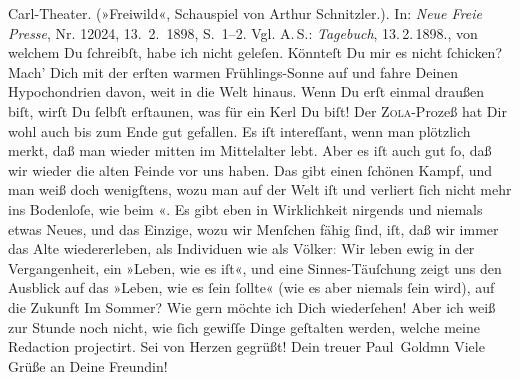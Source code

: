 \begin{ledgroupsized}[t]{13cm}
{{{{                        Carl-Theater. (»Freiwild«, Schauspiel von Arthur Schnitzler.)}. In: \emph{Neue Freie Presse}, Nr. 12024, 13. 2. 1898, S. 1–2. Vgl. A. S.: \emph{Tagebuch}, 13. 2. 1898.}}}\label{K_L02839-5h}, von
               welchem Du ſchreibſt, habe ich nicht geleſen. Könnteſt Du mir es nicht ſchicken?\pend
           \pstart
           Mach’ Dich mit der erſten warmen Frühlings-Sonne auf und fahre Deinen Hypochondrien
               davon, weit in die Welt hinaus. Wenn Du erſt einmal draußen biſt, wirſt Du ſelbſt
               erſtaunen, was für ein Kerl Du biſt!\pend
           \pstart
           Der \textsc{Zola}-Prozeß hat Dir wohl auch bis zum Ende gut gefallen. Es iſt intereſſant,  wenn man plötzlich merkt, daß man wieder mitten im
               Mittelalter lebt. Aber es iſt auch gut ſo, daß \strikeout{\textcolor{gray}{w}} wir wieder die alten Feinde vor uns haben.  Das gibt einen ſchönen Kampf, und {\pb}man weiß
               doch wenigſtens, \strikeout{\textcolor{gray}{e}} wozu man auf der Welt iſt und verliert ſich nicht mehr ins Bodenloſe, wie beim
                  \label{K_L02839-32v}\label{K_L02839-32h}«. Es gibt eben in Wirklichkeit nirgends  und
               niemals etwas Neues, und das Einzige, wozu wir Menſchen fähig ſind, iſt, daß wir
               immer das Alte wiedererleben, als Individuen wie als Völker\textcolor{gray}{:} Wir
               leben ewig in der Vergangenheit, ein »Leben, wie es iſt«, und eine Sinnes-Täuſchung
               zeigt uns den Ausblick auf das »Leben, wie es ſein ſollte« (wie es aber niemals ſein
               wird),  auf die Zukunft{\dotsfive}\pend
           \pstart
           Im Sommer? Wie gern möchte ich Dich wiederſehen! Aber ich weiß zur Stunde noch nicht,
               wie ſich gewiſſe Dinge geſtalten werden, welche meine Redaction projectirt. Sei von Herzen
               gegrüßt!\pend
           \pstart Dein treuer \spacefill\mbox{Paul Goldmn}\pend{}\pstart
           \noindent{}Viele Grüße an Deine Freundin!\pend
           

\end{ledgroupsized}
